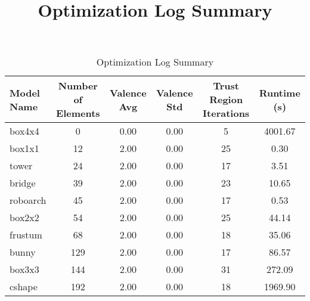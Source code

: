 \documentclass{article}
\begin{document}
\title{Optimization Log Summary}
\author{}
\date{}

\maketitle

\begin{table}[h!]
\centering
\begin{tabular}{|l|c|c|c|c|c|}
\hline
Model Name & Number of Elements & Valence Avg & Valence Std & Trust Region Iterations & Runtime (s) \\
\hline
box4x4 & 0 & 0.00 & 0.00 & 5 & 4001.67 \\
\hline
box1x1 & 12 & 2.00 & 0.00 & 25 & 0.30 \\
\hline
tower & 24 & 2.00 & 0.00 & 17 & 3.51 \\
\hline
bridge & 39 & 2.00 & 0.00 & 23 & 10.65 \\
\hline
roboarch & 45 & 2.00 & 0.00 & 17 & 0.53 \\
\hline
box2x2 & 54 & 2.00 & 0.00 & 25 & 44.14 \\
\hline
frustum & 68 & 2.00 & 0.00 & 18 & 35.06 \\
\hline
bunny & 129 & 2.00 & 0.00 & 17 & 86.57 \\
\hline
box3x3 & 144 & 2.00 & 0.00 & 31 & 272.09 \\
\hline
cshape & 192 & 2.00 & 0.00 & 18 & 1969.90 \\
\hline

\end{tabular}
\caption{Optimization Log Summary}
\label{table:log_summary}
\end{table}
\end{document}
